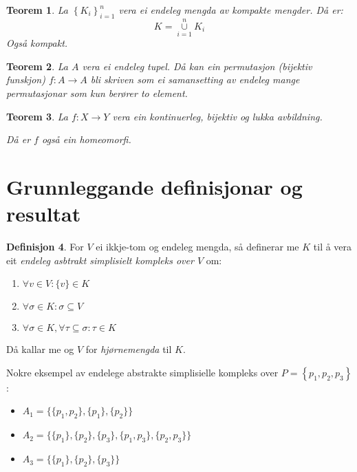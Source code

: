 \documentclass[a4paper, 12pt, norsk]{article}
\theoremstyle{plain}
\newtheorem{theorem}{Teorem}[section]
\theoremstyle{definition}
\newtheorem{definition}[theorem]{Definisjon}
\newcommand{\union}{ \mathop{\cup}\limits }
\newcommand{\set}[1]{ \left \{ #1 \right \} } %
\begin{document}
\begin{theorem} \label{thm:endeleg-union-kompakt-er-kompakt}
	La \( \set{K_i}_{i = 1}^n \) vera ei endeleg mengda av kompakte mengder. Då er:
	\[
		K = \union_{i=1}^n K_i
	\]
	Også kompakt.
\end{theorem}

\begin{theorem} \label{thm:permutasjon}
	La \( A \) vera ei endeleg tupel. Då kan ein permutasjon (bijektiv funskjon) \( f: A \to A \) bli skriven som ei samansetting av endeleg mange permutasjonar som kun berører to element.
\end{theorem}

\begin{theorem} \label{thm:bijektiv-lukka-homeomorfi}
	La \( f: X \to Y \) vera ein kontinuerleg, bijektiv og lukka avbildning.

	Då er \( f \) også ein homeomorfi.
\end{theorem}

\section{Grunnleggande definisjonar og resultat}

\begin{definition} \label{def:ASK}
	For $V$ ei ikkje-tom og endeleg mengda, så definerar me $K$ til å vera eit \emph{endeleg asbtrakt simplisielt kompleks over $V$} om:
	\begin{enumerate}
		\item{$\forall v \in V: \{v\} \in K$}
		\item{\( \forall \sigma \in K: \sigma \subseteq V \)}
		\item{$\forall \sigma \in K, \forall \tau \subseteq \sigma: \tau \in K$}
	\end{enumerate}
	Då kallar me og $V$ for \emph{hjørnemengda} til $K$.
\end{definition}

Nokre eksempel av endelege abstrakte simplisielle kompleks over \( P=\set{p_1, p_2, p_3} \):

\begin{itemize}
	\item{$A_1=\{\{p_1, p_2\}, \{p_1\}, \{p_2\}\}$}
	\item{$A_2=\{\{p_1\}, \{p_2\}, \{p_3\}, \{p_1, p_3\}, \{p_2, p_3\}\}$}
	\item{$A_3=\{\{p_1\}, \{p_2\}, \{p_3\}\}$}
\end{itemize}
\end{document}
